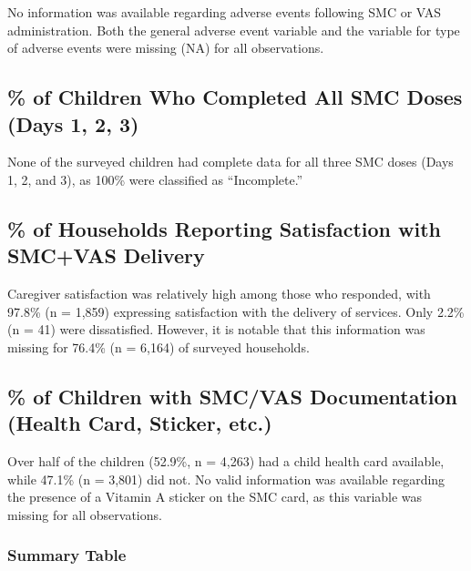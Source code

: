 \documentclass[
  11pt,
]{report}
\begin{document}
No information was available regarding adverse events following SMC or
VAS administration. Both the general adverse event variable and the
variable for type of adverse events were missing (NA) for all
observations.

\subsection{\% of Children Who Completed All SMC Doses (Days 1, 2,
3)}\label{of-children-who-completed-all-smc-doses-days-1-2-3}

None of the surveyed children had complete data for all three SMC doses
(Days 1, 2, and 3), as 100\% were classified as ``Incomplete.''

\subsection{\% of Households Reporting Satisfaction with SMC+VAS
Delivery}\label{of-households-reporting-satisfaction-with-smcvas-delivery}

Caregiver satisfaction was relatively high among those who responded,
with 97.8\% (n = 1,859) expressing satisfaction with the delivery of
services. Only 2.2\% (n = 41) were dissatisfied. However, it is notable
that this information was missing for 76.4\% (n = 6,164) of surveyed
households.

\subsection{\% of Children with SMC/VAS Documentation (Health Card,
Sticker,
etc.)}\label{of-children-with-smcvas-documentation-health-card-sticker-etc.}

Over half of the children (52.9\%, n = 4,263) had a child health card
available, while 47.1\% (n = 3,801) did not. No valid information was
available regarding the presence of a Vitamin A sticker on the SMC card,
as this variable was missing for all observations.

\subsubsection{Summary Table}\label{summary-table}
\end{document}
